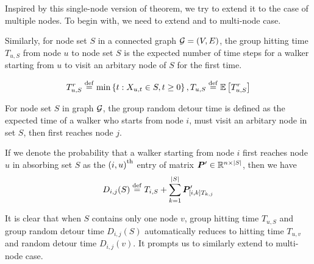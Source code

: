 \documentclass[sigconf]{acmart}
\begin{document}
Inspired by this single-node version of theorem, we try to extend it to the case of multiple nodes.
To begin with, we need to extend  and  to multi-node case.

Similarly, for node set \(S\) in a connected graph \(\mathcal{G}=(V,E)\), the group hitting time \(T_{u,S}\) from node \(u\) to node set \(S\) is the expected number of time steps for a walker starting from \(u\) to visit an arbitary node of \(S\) for the first time.

\begin{definition}\label{def:hitting-time-multiple}
    \[T_{u,S}^r\stackrel{\mathrm{def}}{=}\min\left\{t:X_{u,t}\in S,t\ge0 \right\},T_{u,S}\stackrel{\mathrm{def}}{=}\mathbb{E}\left[T_{u,S}^r\right]\]
\end{definition}

For node set \(S\) in graph \(\mathcal{G}\), the group random detour time is defined as the expected time of a walker who starts from node \(i\), must visit an arbitary node in set \(S\), then first reaches node \(j\).

\begin{definition}\label{def:detour-multiple}
    If we denote the probability that a walker starting from node \(i\) first reaches node \(u\) in absorbing set \(S\) as the \({(i,u)}^{\rm{th}}\) entry of matrix \(\boldsymbol{P}'\in\mathbb{R}^{n\times\left|S \right|}\), then we have
    \[D_{i,j}(S)\stackrel{\mathrm{def}}{=} T_{i,S}+\sum_{k=1}^{\left|S \right|}\boldsymbol{P}'_{[i,k]T_{k,j}}\]
\end{definition}

It is clear that when \(S\) contains only one node \(v\), group hitting time \(T_{u,S}\) and group random detour time \(D_{i,j}(S)\) automatically reduces to hitting time \(T_{u,v}\) and random detour time \(D_{i,j}(v)\).
It prompts us to similarly extend  to multi-node case.
\end{document}
